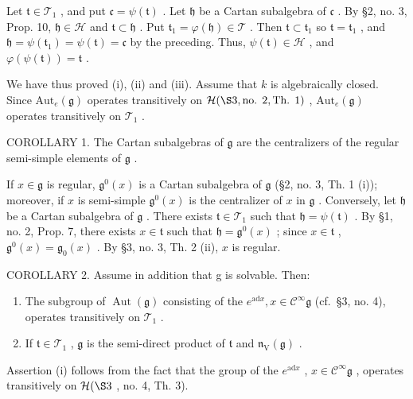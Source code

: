 Let \(\mathfrak{t} \in \mathcal{T}_1\) , and put \(\mathfrak{c} = \psi(\mathfrak{t})\) . Let \(\mathfrak{h}\) be a Cartan subalgebra of \(\mathfrak{c}\) . By §2, no. 3, Prop. 10, \(\mathfrak{h} \in \mathcal{H}\) and \(\mathfrak{t} \subset \mathfrak{h}\) . Put \(\mathfrak{t}_1 = \varphi(\mathfrak{h}) \in \mathcal{T}\) . Then \(\mathfrak{t} \subset \mathfrak{t}_1\) so \(\mathfrak{t} = \mathfrak{t}_1\) , and \(\mathfrak{h} = \psi(\mathfrak{t}_1) = \psi(\mathfrak{t}) = \mathfrak{c}\) by the preceding. Thus, \(\psi(\mathfrak{t}) \in \mathcal{H}\) , and \(\varphi(\psi(\mathfrak{t})) = \mathfrak{t}\) .

We have thus proved (i), (ii) and (iii). Assume that \(k\) is algebraically closed. Since \(\mathrm{Aut}_e(\mathfrak{g})\) operates transitively on \(\mathcal{H}(\S 3, \text{no. } 2, \text{Th. } 1)\) , \(\mathrm{Aut}_e(\mathfrak{g})\) operates transitively on \(\mathcal{T}_1\) .

COROLLARY 1. The Cartan subalgebras of \(\mathfrak{g}\) are the centralizers of the regular semi-simple elements of \(\mathfrak{g}\) .

If \(x \in \mathfrak{g}\) is regular, \(\mathfrak{g}^0(x)\) is a Cartan subalgebra of \(\mathfrak{g}\) (§2, no. 3, Th. 1 (i)); moreover, if \(x\) is semi-simple \(\mathfrak{g}^0(x)\) is the centralizer of \(x\) in \(\mathfrak{g}\) . Conversely, let \(\mathfrak{h}\) be a Cartan subalgebra of \(\mathfrak{g}\) . There exists \(\mathfrak{t} \in \mathcal{T}_1\) such that \(\mathfrak{h} = \psi(\mathfrak{t})\) . By §1, no. 2, Prop. 7, there exists \(x \in \mathfrak{t}\) such that \(\mathfrak{h} = \mathfrak{g}^0(x)\) ; since \(x \in \mathfrak{t}\) , \(\mathfrak{g}^0(x) = \mathfrak{g}_0(x)\) . By §3, no. 3, Th. 2 (ii), \(x\) is regular.

COROLLARY 2. Assume in addition that g is solvable. Then:

\begin{enumerate}
\def\labelenumi{(\roman{enumi})}
\item
  The subgroup of \(\operatorname{Aut}(\mathfrak{g})\) consisting of the \(e^{\mathrm{ad}x}, x \in \mathcal{C}^{\infty}\mathfrak{g}\) (cf.~§3, no. 4), operates transitively on \(\mathcal{T}_1\) .
\item
  If \(\mathfrak{t} \in \mathcal{T}_1\) , \(\mathfrak{g}\) is the semi-direct product of \(\mathfrak{t}\) and \(\mathfrak{n}_{\mathrm{V}}(\mathfrak{g})\) .
\end{enumerate}

Assertion (i) follows from the fact that the group of the \(e^{\mathrm{ad}x}\) , \(x \in \mathcal{C}^{\infty}\mathfrak{g}\) , operates transitively on \(\mathcal{H}(\S 3\) , no. 4, Th. 3).

